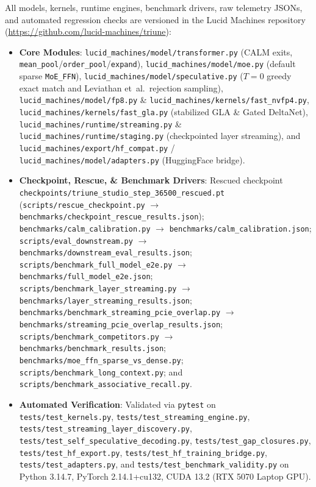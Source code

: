 \documentclass[10pt,twocolumn,letterpaper]{article}
\begin{document}
All models, kernels, runtime engines, benchmark drivers, raw telemetry JSONs, and automated regression checks are versioned in the Lucid Machines repository (\url{https://github.com/lucid-machines/triune}):
\begin{itemize}\raggedright\setlength{\itemsep}{2pt}
    \item \textbf{Core Modules}: \texttt{lucid\_machines/model/transformer.py} (CALM exits, \texttt{mean\_pool}/\texttt{order\_pool}/\texttt{expand}), \texttt{lucid\_machines/model/moe.py} (default sparse \texttt{MoE\_FFN}), \texttt{lucid\_machines/model/speculative.py} ($T=0$ greedy exact match and Leviathan et~al.\ rejection sampling), \texttt{lucid\_machines/model/fp8.py} \& \texttt{lucid\_machines/kernels/fast\_nvfp4.py}, \texttt{lucid\_machines/kernels/fast\_gla.py} (stabilized GLA \& Gated DeltaNet), \texttt{lucid\_machines/runtime/streaming.py} \& \texttt{lucid\_machines/runtime/staging.py} (checkpointed layer streaming), and \texttt{lucid\_machines/export/hf\_compat.py} / \texttt{lucid\_machines/model/adapters.py} (HuggingFace bridge).
    \item \textbf{Checkpoint, Rescue, \& Benchmark Drivers}: Rescued checkpoint \nolinkurl{checkpoints/triune_studio_step_36500_rescued.pt} (\nolinkurl{scripts/rescue_checkpoint.py} $\to$ \nolinkurl{benchmarks/checkpoint_rescue_results.json}); \nolinkurl{benchmarks/calm_calibration.py} $\to$ \nolinkurl{benchmarks/calm_calibration.json}; \nolinkurl{scripts/eval_downstream.py} $\to$ \nolinkurl{benchmarks/downstream_eval_results.json}; \nolinkurl{scripts/benchmark_full_model_e2e.py} $\to$ \nolinkurl{benchmarks/full_model_e2e.json}; \nolinkurl{scripts/benchmark_layer_streaming.py} $\to$ \nolinkurl{benchmarks/layer_streaming_results.json}; \nolinkurl{benchmarks/benchmark_streaming_pcie_overlap.py} $\to$ \nolinkurl{benchmarks/streaming_pcie_overlap_results.json}; \nolinkurl{scripts/benchmark_competitors.py} $\to$ \nolinkurl{benchmarks/benchmark_results.json}; \nolinkurl{benchmarks/moe_ffn_sparse_vs_dense.py}; \nolinkurl{scripts/benchmark_long_context.py}; and \nolinkurl{scripts/benchmark_associative_recall.py}.
    \item \textbf{Automated Verification}: Validated via \texttt{pytest} on \nolinkurl{tests/test_kernels.py}, \nolinkurl{tests/test_streaming_engine.py}, \nolinkurl{tests/test_streaming_layer_discovery.py}, \nolinkurl{tests/test_self_speculative_decoding.py}, \nolinkurl{tests/test_gap_closures.py}, \nolinkurl{tests/test_hf_export.py}, \nolinkurl{tests/test_hf_training_bridge.py}, \nolinkurl{tests/test_adapters.py}, and \nolinkurl{tests/test_benchmark_validity.py} on Python 3.14.7, PyTorch 2.14.1+cu132, CUDA 13.2 (RTX 5070 Laptop GPU).
\end{itemize}
\end{document}

